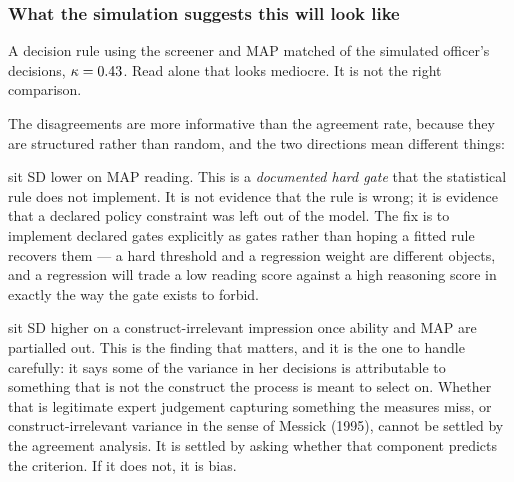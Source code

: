 \documentclass[11pt,a4paper]{article}
\begin{document}
\subsubsection*{What the simulation suggests this will look like}


A decision rule using the screener and MAP matched \OfficerMatchPct{} of the
simulated officer's decisions, $\kappa=0.43$. Read alone that looks
mediocre. It is not the right comparison.


The disagreements are more informative than the agreement rate, because they are
structured rather than random, and the two directions mean different things:

\begin{description}[leftmargin=0em,itemsep=0.35em]

\item[Files the rule would admit and she declined] sit \OfficerGateSD{} SD lower
on MAP reading. This is a \emph{documented hard gate} that the statistical rule
does not implement. It is not evidence that the rule is wrong; it is evidence
that a declared policy constraint was left out of the model. The fix is to
implement declared gates explicitly as gates rather than hoping a fitted rule
recovers them --- a hard threshold and a regression weight are different objects,
and a regression will trade a low reading score against a high reasoning score
in exactly the way the gate exists to forbid.

\item[Files she admitted and the rule declined] sit \OfficerImpressionSD{} SD
higher on a construct-irrelevant impression once ability and MAP are partialled
out. This is the finding that matters, and it is the one to handle carefully:
it says some of the variance in her decisions is attributable to something that
is not the construct the process is meant to select on. Whether that is
legitimate expert judgement capturing something the measures miss, or
construct-irrelevant variance in the sense of Messick (1995), cannot be
settled by the agreement analysis. It is settled by asking whether that
component predicts the criterion. If it does not, it is bias.

\end{description}
\end{document}

